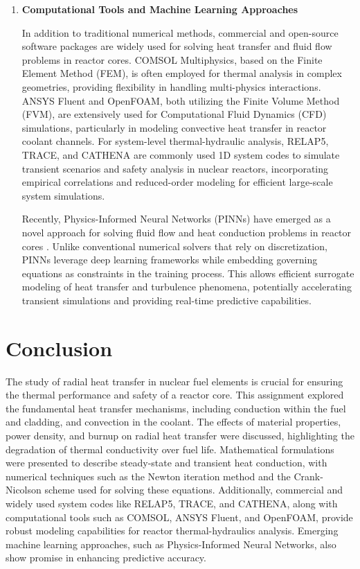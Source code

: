 \documentclass[12pt]{article}
\begin{document}
\begin{multicols}{2}
\begin{enumerate}
    \item \textbf{Computational Tools and Machine Learning Approaches}

    In addition to traditional numerical methods, commercial and open-source software packages are widely used for solving heat transfer and fluid flow problems in reactor cores. COMSOL Multiphysics, based on the Finite Element Method (FEM), is often employed for thermal analysis in complex geometries, providing flexibility in handling multi-physics interactions. ANSYS Fluent and OpenFOAM, both utilizing the Finite Volume Method (FVM), are extensively used for Computational Fluid Dynamics (CFD) simulations, particularly in modeling convective heat transfer in reactor coolant channels. For system-level thermal-hydraulic analysis, RELAP5, TRACE, and CATHENA are commonly used 1D system codes to simulate transient scenarios and safety analysis in nuclear reactors, incorporating empirical correlations and reduced-order modeling for efficient large-scale system simulations.

    Recently, Physics-Informed Neural Networks (PINNs) have emerged as a novel approach for solving fluid flow and heat conduction problems in reactor cores \cite{coppo2025application, jalili2024physics}. Unlike conventional numerical solvers that rely on discretization, PINNs leverage deep learning frameworks while embedding governing equations as constraints in the training process. This allows efficient surrogate modeling of heat transfer and turbulence phenomena, potentially accelerating transient simulations and providing real-time predictive capabilities.
    
\end{enumerate}

\end{multicols}

\section{Conclusion}

The study of radial heat transfer in nuclear fuel elements is crucial for ensuring the thermal performance and safety of a reactor core. This assignment explored the fundamental heat transfer mechanisms, including conduction within the fuel and cladding, and convection in the coolant. The effects of material properties, power density, and burnup on radial heat transfer were discussed, highlighting the degradation of thermal conductivity over fuel life. Mathematical formulations were presented to describe steady-state and transient heat conduction, with numerical techniques such as the Newton iteration method and the Crank-Nicolson scheme used for solving these equations. Additionally, commercial and widely used system codes like RELAP5, TRACE, and CATHENA, along with computational tools such as COMSOL, ANSYS Fluent, and OpenFOAM, provide robust modeling capabilities for reactor thermal-hydraulics analysis. Emerging machine learning approaches, such as Physics-Informed Neural Networks, also show promise in enhancing predictive accuracy.
\end{document}
